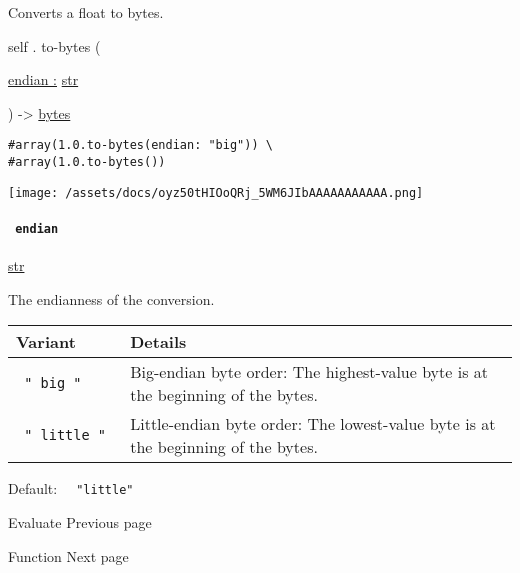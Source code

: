 Converts a float to bytes.

self { . } { to-bytes } (

{ \hyperref[definitions-to-bytes-parameters-endian]{endian :}
\href{/docs/reference/foundations/str/}{str} }

) -\textgreater{} \href{/docs/reference/foundations/bytes/}{bytes}

\begin{verbatim}
#array(1.0.to-bytes(endian: "big")) \
#array(1.0.to-bytes())
\end{verbatim}

\texttt{[image: /assets/docs/oyz50tHIOoQRj\_5WM6JIbAAAAAAAAAAA.png]}

\paragraph{\texorpdfstring{\texttt{\ endian\ }}{ endian }}\label{definitions-to-bytes-endian}

\href{/docs/reference/foundations/str/}{str}

The endianness of the conversion.

\begin{longtable}[]{@{}ll@{}}
\toprule\noalign{}
Variant & Details \\
\midrule\noalign{}
\endhead
\bottomrule\noalign{}
\endlastfoot
\texttt{\ "\ big\ "\ } & Big-endian byte order: The highest-value byte
is at the beginning of the bytes. \\
\texttt{\ "\ little\ "\ } & Little-endian byte order: The lowest-value
byte is at the beginning of the bytes. \\
\end{longtable}

Default: \texttt{\ }{\texttt{\ "little"\ }}\texttt{\ }

\href{/docs/reference/foundations/eval/}{\pandocbounded{}}

{ Evaluate } { Previous page }

\href{/docs/reference/foundations/function/}{\pandocbounded{}}

{ Function } { Next page }
